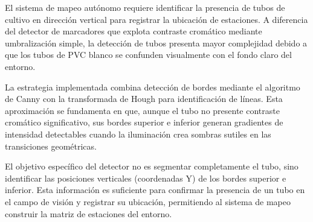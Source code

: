 El sistema de mapeo autónomo requiere identificar la presencia de tubos de cultivo en dirección vertical para registrar la ubicación de estaciones. A diferencia del detector de marcadores que explota contraste cromático mediante umbralización simple, la detección de tubos presenta mayor complejidad debido a que los tubos de PVC blanco se confunden visualmente con el fondo claro del entorno.

La estrategia implementada combina detección de bordes mediante el algoritmo de Canny con la transformada de Hough para identificación de líneas. Esta aproximación se fundamenta en que, aunque el tubo no presente contraste cromático significativo, sus bordes superior e inferior generan gradientes de intensidad detectables cuando la iluminación crea sombras sutiles en las transiciones geométricas.

El objetivo específico del detector no es segmentar completamente el tubo, sino identificar las posiciones verticales (coordenadas Y) de los bordes superior e inferior. Esta información es suficiente para confirmar la presencia de un tubo en el campo de visión y registrar su ubicación, permitiendo al sistema de mapeo construir la matriz de estaciones del entorno.

